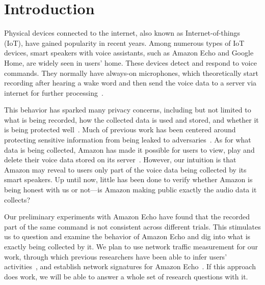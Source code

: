 \section{Introduction}
Physical devices connected to the internet, also known as Internet-of-things (IoT), have gained popularity in recent years. Among numerous types of IoT devices, smart speakers with voice assistants, such as Amazon Echo and Google Home, are widely seen in users' home. These devices detect and respond to voice commands. They normally have always-on microphones, which theoretically start recording after hearing a wake word and then send the voice data to a server via internet for further processing~\cite{AmazonEc68:online}.

This behavior has sparked many privacy concerns, including but not limited to what is being recorded, how the collected data is used and stored, and whether it is being protected well~\cite{lau2018alexa, fowler_2019, apthorpe2017smart, apthorpe2019keeping, apthorpe2017spying}. Much of previous work has been centered around protecting sensitive information from being leaked to adversaries~\cite{apthorpe2017smart, apthorpe2019keeping, apthorpe2017spying}. As for what data is being collected, Amazon has made it possible for users to view, play and delete their voice data stored on its server~\cite{ford2019alexa}. However, our intuition is that Amazon may reveal to users only part of the voice data being collected by its smart speakers. Up until now, little has been done to verify whether Amazon is being honest with us or not---is Amazon making public exactly the audio data it collects?

Our preliminary experiments with Amazon Echo have found that the recorded part of the same command is not consistent across different trials. This stimulates us to question and examine the behavior of Amazon Echo and dig into what is exactly being collected by it. We plan to use network traffic measurement for our work, through which previous researchers have been able to infer users' activities~\cite{apthorpe2017spying}, and establish network signatures for Amazon Echo~\cite{ford2019alexa}. If this approach does work, we will be able to answer a whole set of research questions with it.
